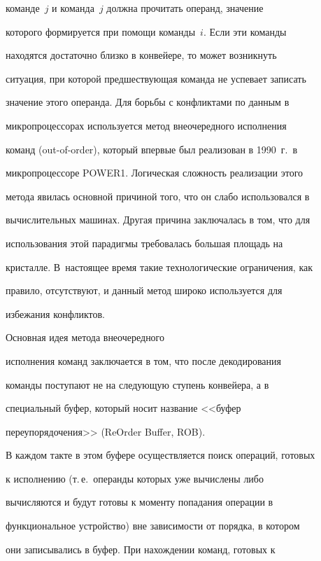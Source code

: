 команде~$j$ и команда~$j$ должна прочитать операнд, значение 


которого формируется при помощи команды~$i$. Если эти команды 


находятся достаточно близко в конвейере, то может возникнуть 


ситуация, при которой предшествующая команда не успевает записать 


значение этого операнда. Для борьбы с конфликтами по данным в 


микропроцессорах используется метод внеочередного исполнения 


команд (out-of-order), который впервые  был реализован в 1990~г.\ в 


микропроцессоре POWER1. Логическая сложность реализации этого 


метода явилась основной причиной того, что он слабо использовался в 


вычислительных машинах. Другая причина заключалась в том, что для 


использования этой парадигмы требовалась большая площадь на 


кристалле. В~настоящее время такие технологические ограничения, как 


правило, отсутствуют, и данный метод широко используется для 


избежания конфликтов. 





Основная идея  метода внеочередного 


исполнения команд  заключается в том, что после декодирования 


команды поступают не на следующую ступень конвейера, а в 


специальный буфер, который носит название <<буфер 


переупорядочения>> (ReOrder Buffer, ROB). 





В каждом такте в этом буфере осуществляется поиск операций, готовых 


к исполнению (т.\,е.\ операнды которых уже вычислены либо 


вычисляются и будут готовы к моменту попадания операции в 


функциональное устройство) вне зависимости от порядка, в котором 


они записывались в буфер. При нахождении команд, готовых к 


